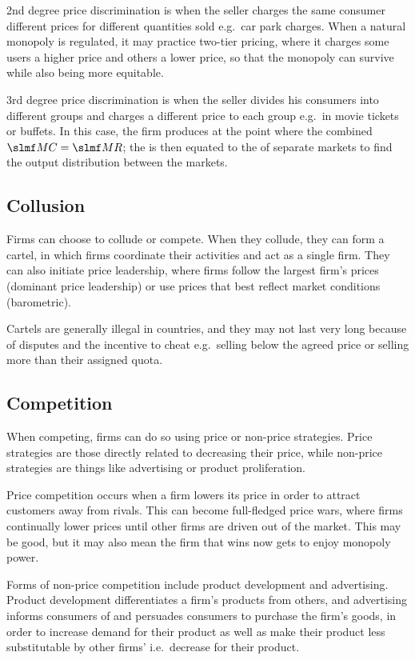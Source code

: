 \documentclass[Economics.tex]{subfiles}
\begin{document}
2nd degree price discrimination is when the seller charges the same consumer different prices for different quantities sold e.g.\ car park charges. When a natural monopoly is regulated, it may practice two-tier pricing, where it charges some users a higher price and others a lower price, so that the monopoly can survive while also being more equitable.

3rd degree price discrimination is when the seller divides his consumers into different groups and charges a different price to each group e.g.\ in movie tickets or buffets. In this case, the firm produces at the point where the combined \(\mrg{C} = \mrg{R}\); the  is then equated to the  of separate markets to find the output distribution between the markets.
\subsection{Collusion}
Firms can choose to collude or compete. When they collude, they can form a cartel, in which firms coordinate their activities and act as a single firm. They can also initiate price leadership, where firms follow the largest firm's prices (dominant price leadership) or use prices that best reflect market conditions (barometric).

Cartels are generally illegal in countries, and they may not last very long because of disputes and the incentive to cheat e.g.\ selling below the agreed price or selling more than their assigned quota.
\subsection{Competition}
When competing, firms can do so using price or non-price strategies. Price strategies are those directly related to decreasing their price, while non-price strategies are things like advertising or product proliferation.

Price competition occurs when a firm lowers its price in order to attract customers away from rivals. This can become full-fledged price wars, where firms continually lower prices until other firms are driven out of the market. This may be good, but it may also mean the firm that wins now gets to enjoy monopoly power.

Forms of non-price competition include product development and advertising. Product development differentiates a firm's products from others, and advertising informs consumers of and persuades consumers to purchase the firm's goods, in order to increase demand for their product as well as make their product less substitutable by other firms' i.e.\ decrease \PE[D] for their product.
\end{document}

